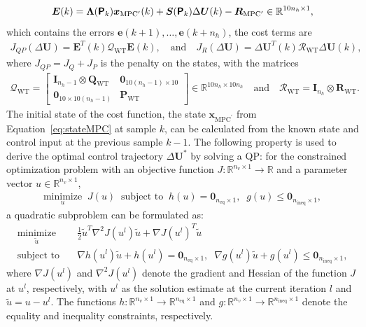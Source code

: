 \begin{align*}
    \bm{E}(k) = \bm{\Lambda}(\bm{\mathsf{P}}_k)\bm{x}_{\text{MPC}^\prime}(k) + \bm{S}(\bm{\mathsf{P}}_k) \Delta \bm{U}(k) - \bm{R}_{\text{MPC}^\prime} \in \mathbb{R}^{10 n_h \times 1},
\end{align*}
which contains the errors $\bm{e}(k+1), \dots, \bm{e}(k+n_h)$, the cost terms are
\begin{align*}
    J_{QP}(\Delta \bm{U}) = \bm{E}^T(k) \bm{\mathcal{Q}}_{\text{WT}} \bm{E}(k),\quad \text{and} \quad
    J_R(\Delta \bm{U}) = \Delta \bm{U}^T(k) \bm{\mathcal{R}}_{\text{WT}} \Delta \bm{U}(k),
\end{align*}
where $J_{QP} = J_Q + J_P$ is the penalty on the states, with the matrices
\begin{align*}
    \bm{\mathcal{Q}}_{\text{WT}} = \begin{bmatrix} \bm{I}_{n_h -1} \otimes \bm{Q}_{\text{WT}} & \bm{0}_{10(n_h-1)\times10} \\ \bm{0}_{10\times10(n_h-1)} & \bm{P}_{\text{WT}}\end{bmatrix} \in \mathbb{R}^{10n_h \times 10n_h}\quad\text{and}\quad \bm{\mathcal{R}}_{\text{WT}} = \bm{I}_{n_h} \otimes \bm{R}_{\text{WT}}.
\end{align*}
%
The initial state of the cost function, the state $\bm{x}_{\text{MPC}^\prime}$ from Equation~\eqref{eq:stateMPC} at sample $k$, can be calculated from the known state and control input at the previous sample $k-1$. 
%
The following property is used to derive the optimal control trajectory $\Delta \bm{U}^*$ by solving a QP: for the constrained optimization problem with an objective function $J: \mathbb{R}^{n_v \times 1} \to \mathbb{R}$ and a parameter vector $u \in \mathbb{R}^{n_v \times 1}$,
\begin{align*}
    \underset{u}{\text{minimize}} \;\; J(u) \;\;
    \text{subject to}  \;\; h(u) = \bm{0}_{n_{\text{eq}} \times 1}, 
    \;\; g(u) \leq \bm{0}_{n_{\text{ineq}} \times 1},
\end{align*}
a quadratic subproblem can be formulated as:
\begin{align}
    \underset{\tilde{u}}{\text{minimize}} & \quad \frac{1}{2} \tilde{u}^T \nabla^2 J(u^l) \tilde{u} + \nabla J(u^l)^T \tilde{u} \\
    \text{subject to} & \quad \nabla h(u^l)\tilde{u} + h(u^l) = \bm{0}_{n_{\text{eq}} \times 1}, \;\; \nabla g(u^l)\tilde{u} + g(u^l) \leq \bm{0}_{n_{\text{ineq}} \times 1} \label{eq:linsubproblemIneqConst},
\end{align}
where \( \nabla J(u^l) \) and $\nabla^2 J(u^l)$ denote the gradient and Hessian of the function \( J \) at \( u^l \), respectively, with \( u^l \) as the solution estimate at the current iteration \( l \) and \( \tilde{u} = u - u^l \). The functions $h: \mathbb{R}^{n_v \times 1} \to \mathbb{R}^{n_{\text{eq}} \times 1}$ and $g: \mathbb{R}^{n_v \times 1} \to \mathbb{R}^{n_{\text{ineq}} \times 1}$ denote the equality and inequality constraints, respectively.

